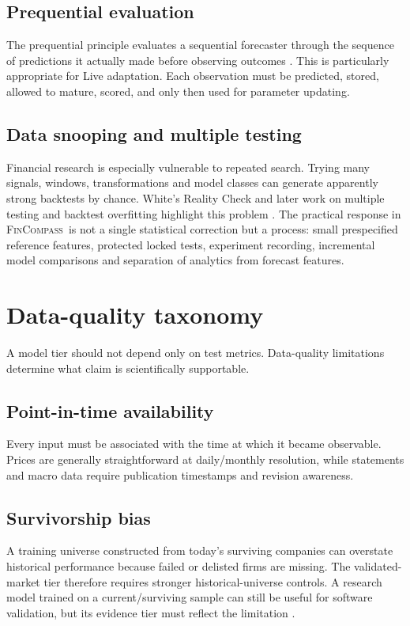 \documentclass[11pt]{article}
\newcommand{\FC}{\textsc{FinCompass}}
\begin{document}
\subsection{Prequential evaluation}
The prequential principle evaluates a sequential forecaster through the sequence of predictions it actually made before observing outcomes \citep{dawid1984prequential}. This is particularly appropriate for Live adaptation. Each observation must be predicted, stored, allowed to mature, scored, and only then used for parameter updating.

\subsection{Data snooping and multiple testing}
Financial research is especially vulnerable to repeated search. Trying many signals, windows, transformations and model classes can generate apparently strong backtests by chance. White's Reality Check and later work on multiple testing and backtest overfitting highlight this problem \citep{white2000reality,harvey2016crosssection,bailey2017pbo}. The practical response in \FC\ is not a single statistical correction but a process: small prespecified reference features, protected locked tests, experiment recording, incremental model comparisons and separation of analytics from forecast features.

\section{Data-quality taxonomy}
A model tier should not depend only on test metrics. Data-quality limitations determine what claim is scientifically supportable.

\subsection{Point-in-time availability}
Every input must be associated with the time at which it became observable. Prices are generally straightforward at daily/monthly resolution, while statements and macro data require publication timestamps and revision awareness.

\subsection{Survivorship bias}
A training universe constructed from today's surviving companies can overstate historical performance because failed or delisted firms are missing. The validated-market tier therefore requires stronger historical-universe controls. A research model trained on a current/surviving sample can still be useful for software validation, but its evidence tier must reflect the limitation \citep{shumway1997delisting}.
\end{document}
